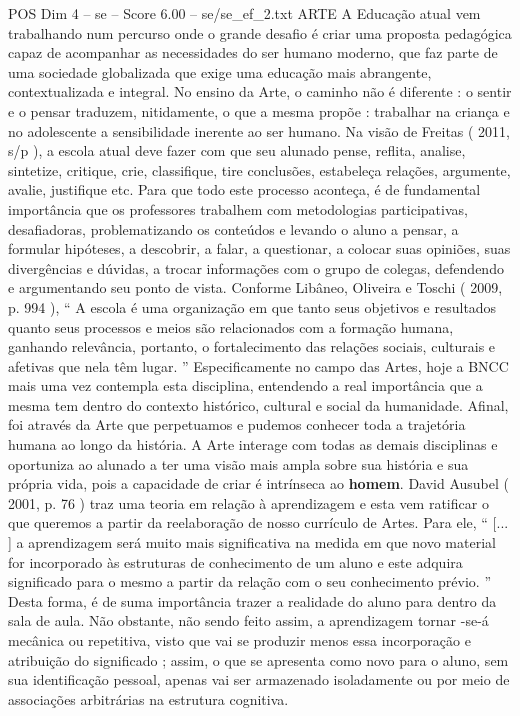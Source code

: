\begin{textsample}{POS Dim 4 – se – Score 6.00 – se/se\_ef\_2.txt}  \label{ex:f4_pos_149}
ARTE A Educação atual vem trabalhando num percurso onde o grande desafio é criar uma proposta pedagógica capaz de acompanhar as necessidades do ser humano moderno, que faz parte de uma sociedade globalizada que exige uma educação mais abrangente, contextualizada e integral.
No ensino da Arte, o caminho não é diferente : o sentir e o pensar traduzem, nitidamente, o que a mesma propõe : trabalhar na criança e no adolescente a sensibilidade inerente ao ser humano.
Na visão de Freitas ( 2011, s/p ), a escola atual deve fazer com que seu alunado pense, reflita, analise, sintetize, critique, crie, classifique, tire conclusões, estabeleça relações, argumente, avalie, justifique etc.
Para que todo este processo aconteça, é de fundamental importância que os professores trabalhem com metodologias participativas, desafiadoras, problematizando os conteúdos e levando o aluno a pensar, a formular hipóteses, a descobrir, a falar, a questionar, a colocar suas opiniões, suas divergências e dúvidas, a trocar informações com o grupo de colegas, defendendo e argumentando seu ponto de vista.
Conforme Libâneo, Oliveira e Toschi ( 2009, p. 994 ), “ A escola é uma organização em que tanto seus objetivos e resultados quanto seus processos e meios são relacionados com a formação humana, ganhando relevância, portanto, o fortalecimento das relações sociais, culturais e afetivas que nela têm lugar. ” Especificamente no campo das Artes, hoje a BNCC mais uma vez contempla esta disciplina, entendendo a real importância que a mesma tem dentro do contexto histórico, cultural e social da humanidade.
Afinal, foi através da Arte que perpetuamos e pudemos conhecer toda a trajetória humana ao longo da história.
A Arte interage com todas as demais disciplinas e oportuniza ao alunado a ter uma visão mais ampla sobre sua história e sua própria vida, pois a capacidade de criar é intrínseca ao \textbf{homem}.
David Ausubel ( 2001, p. 76 ) traz uma teoria em relação à aprendizagem e esta vem ratificar o que queremos a partir da reelaboração de nosso currículo de Artes.
Para ele, “ [... ] a aprendizagem será muito mais significativa na medida em que novo material for incorporado às estruturas de conhecimento de um aluno e este adquira significado para o mesmo a partir da relação com o seu conhecimento prévio. ” Desta forma, é de suma importância trazer a realidade do aluno para dentro da sala de aula.
Não obstante, não sendo feito assim, a aprendizagem tornar -se-á mecânica ou repetitiva, visto que vai se produzir menos essa incorporação e atribuição do significado ; assim, o que se apresenta como novo para o aluno, sem sua identificação pessoal, apenas vai ser armazenado isoladamente ou por meio de associações arbitrárias na estrutura cognitiva.

\end{textsample}
